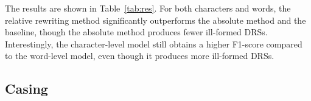 \documentclass[11pt,a4paper]{article}
\begin{document}
The results are shown in Table~\ref{tab:res}. For both characters and words, the relative rewriting method significantly outperforms the absolute method and the baseline, though the absolute method produces fewer ill-formed DRSs. 
Interestingly, the character-level model still obtains a higher F1-score compared to the word-level model, even though it produces more ill-formed DRSs.

\begin{table}[h]
\centering
{}
\caption{Results of the 10-fold CV experiments regarding tokenization, variable rewriting and casing. \emph{bs/mos} means that we use no tokenization for the character-level parser, while we use Moses for the word-level parser.}
\label{tab:res}
\end{table}

\subsection{Casing}
\end{document}

